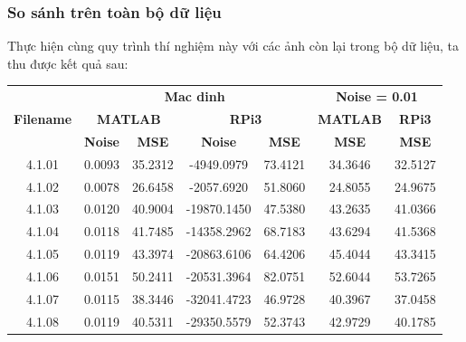\subsubsection{So sánh trên toàn bộ dữ liệu}

Thực hiện cùng quy trình thí nghiệm này với các ảnh còn lại trong bộ dữ liệu, ta thu được kết quả sau:

\begin{table}[H]
\centering
\begin{tabular}{|c|cccc|cc|}
\hline
\multirow{3}{*}{\textbf{Filename}} & \multicolumn{4}{c|}{\textbf{Mac dinh}} & \multicolumn{2}{c|}{\textbf{Noise = 0.01}} \\ \cline{2-7} 
 & \multicolumn{2}{c|}{\textbf{MATLAB}} & \multicolumn{2}{c|}{\textbf{RPi3}} & \multicolumn{1}{c|}{\textbf{MATLAB}} & \textbf{RPi3} \\ \cline{2-7} 
 & \multicolumn{1}{c|}{\textbf{Noise}} & \multicolumn{1}{c|}{\textbf{MSE}} & \multicolumn{1}{c|}{\textbf{Noise}} & \textbf{MSE} & \multicolumn{1}{c|}{\textbf{MSE}} & \textbf{MSE} \\ \hline
4.1.01 & \multicolumn{1}{c|}{0.0093} & \multicolumn{1}{c|}{35.2312} & \multicolumn{1}{c|}{-4949.0979} & 73.4121 & \multicolumn{1}{c|}{34.3646} & 32.5127 \\ \hline
4.1.02 & \multicolumn{1}{c|}{0.0078} & \multicolumn{1}{c|}{26.6458} & \multicolumn{1}{c|}{-2057.6920} & 51.8060 & \multicolumn{1}{c|}{24.8055} & 24.9675 \\ \hline
4.1.03 & \multicolumn{1}{c|}{0.0120} & \multicolumn{1}{c|}{40.9004} & \multicolumn{1}{c|}{-19870.1450} & 47.5380 & \multicolumn{1}{c|}{43.2635} & 41.0366 \\ \hline
4.1.04 & \multicolumn{1}{c|}{0.0118} & \multicolumn{1}{c|}{41.7485} & \multicolumn{1}{c|}{-14358.2962} & 68.7183 & \multicolumn{1}{c|}{43.6294} & 41.5368 \\ \hline
4.1.05 & \multicolumn{1}{c|}{0.0119} & \multicolumn{1}{c|}{43.3974} & \multicolumn{1}{c|}{-20863.6106} & 64.4206 & \multicolumn{1}{c|}{45.4044} & 43.3415 \\ \hline
4.1.06 & \multicolumn{1}{c|}{0.0151} & \multicolumn{1}{c|}{50.2411} & \multicolumn{1}{c|}{-20531.3964} & 82.0751 & \multicolumn{1}{c|}{52.6044} & 53.7265 \\ \hline
4.1.07 & \multicolumn{1}{c|}{0.0115} & \multicolumn{1}{c|}{38.3446} & \multicolumn{1}{c|}{-32041.4723} & 46.9728 & \multicolumn{1}{c|}{40.3967} & 37.0458 \\ \hline
4.1.08 & \multicolumn{1}{c|}{0.0119} & \multicolumn{1}{c|}{40.5311} & \multicolumn{1}{c|}{-29350.5579} & 52.3743 & \multicolumn{1}{c|}{42.9729} & 40.1785 \\ \hline

\end{tabular}
\end{table}
